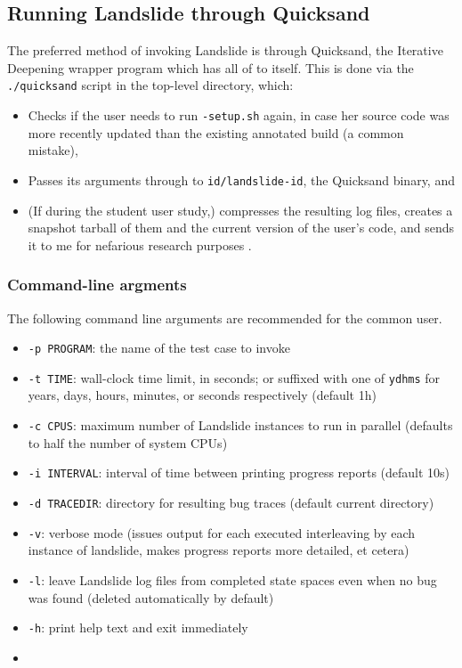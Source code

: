 \subsection{Running Landslide through Quicksand}
\label{sec:landslide-quicksand-options}

The preferred method of invoking Landslide is through Quicksand, the Iterative Deepening wrapper program which has all of  to itself.
This is done via the {\tt ./quicksand} script in the top-level directory, which:
\begin{itemize}
	\item Checks if the user needs to run {\tt *-setup.sh} again, in case her source code was more recently updated than the existing annotated build (a common mistake),
	\item Passes its arguments through to {\tt id/landslide-id}, the Quicksand binary,
		and
	\item (If during the student user study,) compresses the resulting log files,
		creates a snapshot tarball of them and the current version of the user's code,
		and sends it to me for nefarious research purposes
		.
\end{itemize}


\subsubsection{Command-line argments}

The following command line arguments are recommended for the common user.

\begin{itemize}
	\item {\tt -p PROGRAM}: the name of the test case to invoke
	\item {\tt -t TIME}: wall-clock time limit, in seconds; or suffixed with one of {\tt ydhms} for years, days, hours, minutes, or seconds respectively (default 1h)
	\item {\tt -c CPUS}: maximum number of Landslide instances to run in parallel (defaults to half the number of system CPUs)
	\item {\tt -i INTERVAL}: interval of time between printing progress reports (default 10s)
	\item {\tt -d TRACEDIR}: directory for resulting bug traces (default current directory)
	\item {\tt -v}: verbose mode (issues output for each executed interleaving by each instance of landslide, makes progress reports more detailed, et cetera)
	\item {\tt -l}: leave Landslide log files from completed state spaces even when no bug was found (deleted automatically by default)
	\item {\tt -h}: print help text and exit immediately
	\item {}
\end{itemize}

